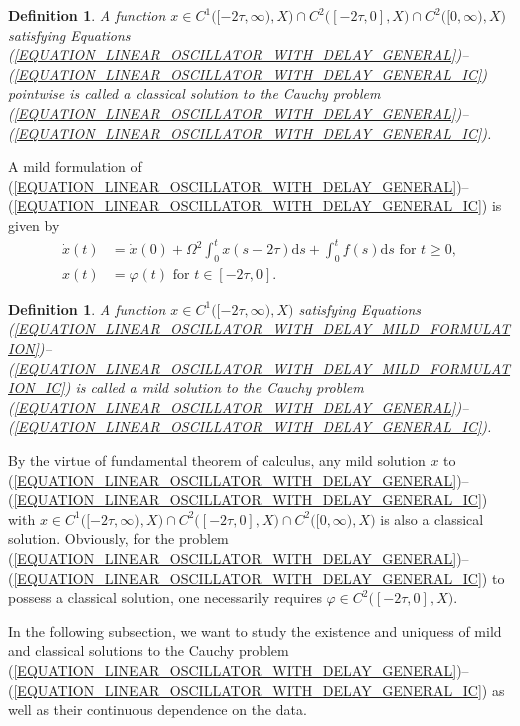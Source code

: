 \documentclass[12pt]{article}
\newtheorem{definition}[theorem]{Definition}
\numberwithin{equation}{section}
\numberwithin{equation}{section}
\begin{document}
	\begin{definition}
		A function $x \in C^{1}\big([-2\tau, \infty), X\big) \cap C^{2}\big([-2\tau, 0], X\big) \cap C^{2}\big([0, \infty), X\big)$
		satisfying Equations (\ref{EQUATION_LINEAR_OSCILLATOR_WITH_DELAY_GENERAL})--(\ref{EQUATION_LINEAR_OSCILLATOR_WITH_DELAY_GENERAL_IC})
		pointwise is called a classical solution to the Cauchy problem (\ref{EQUATION_LINEAR_OSCILLATOR_WITH_DELAY_GENERAL})--(\ref{EQUATION_LINEAR_OSCILLATOR_WITH_DELAY_GENERAL_IC}).
	\end{definition}

	A mild formulation of (\ref{EQUATION_LINEAR_OSCILLATOR_WITH_DELAY_GENERAL})--(\ref{EQUATION_LINEAR_OSCILLATOR_WITH_DELAY_GENERAL_IC}) is given by
	\begin{align}
		\dot{x}(t) &= \dot{x}(0) + \Omega^{2} \int_{0}^{t} x(s - 2\tau) \mathrm{d}s + \int_{0}^{t} f(s) \mathrm{d}s \text{ for } t \geq 0, \label{EQUATION_LINEAR_OSCILLATOR_WITH_DELAY_MILD_FORMULATION} \\
		x(t) &= \varphi(t) \text{ for } t \in [-2\tau, 0]. \label{EQUATION_LINEAR_OSCILLATOR_WITH_DELAY_MILD_FORMULATION_IC}
	\end{align}
	
	\begin{definition}
		A function $x \in C^{1}\big([-2\tau, \infty), X\big)$ satisfying Equations (\ref{EQUATION_LINEAR_OSCILLATOR_WITH_DELAY_MILD_FORMULATION})--(\ref{EQUATION_LINEAR_OSCILLATOR_WITH_DELAY_MILD_FORMULATION_IC})
		is called a mild solution to the Cauchy problem (\ref{EQUATION_LINEAR_OSCILLATOR_WITH_DELAY_GENERAL})--(\ref{EQUATION_LINEAR_OSCILLATOR_WITH_DELAY_GENERAL_IC}).
	\end{definition}

	By the virtue of fundamental theorem of calculus,
	any mild solution $x$ to (\ref{EQUATION_LINEAR_OSCILLATOR_WITH_DELAY_GENERAL})--(\ref{EQUATION_LINEAR_OSCILLATOR_WITH_DELAY_GENERAL_IC})
	with $x \in C^{1}\big([-2\tau, \infty), X\big) \cap C^{2}\big([-2\tau, 0], X\big) \cap C^{2}\big([0, \infty), X\big)$
	is also a classical solution.
	Obviously, for the problem (\ref{EQUATION_LINEAR_OSCILLATOR_WITH_DELAY_GENERAL})--(\ref{EQUATION_LINEAR_OSCILLATOR_WITH_DELAY_GENERAL_IC})
	to possess a classical solution, one necessarily requires $\varphi \in C^{2}\big([-2\tau, 0], X\big)$.

	In the following subsection,
	we want to study the existence and uniquess of mild and classical solutions to the Cauchy problem (\ref{EQUATION_LINEAR_OSCILLATOR_WITH_DELAY_GENERAL})--(\ref{EQUATION_LINEAR_OSCILLATOR_WITH_DELAY_GENERAL_IC})
	as well as their continuous dependence on the data.
\end{document}
